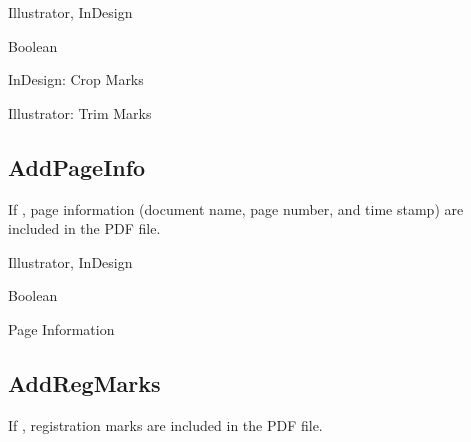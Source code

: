 \documentclass[letterpaper,12pt,english,openany,oneside]{sphinxmanual}
\begin{document}
\label{\detokenize{PDF_Create_NewNamespaces:supported-by-2}}

Illustrator, InDesign

\label{\detokenize{PDF_Create_NewNamespaces:type-2}}

Boolean

\label{\detokenize{PDF_Create_NewNamespaces:ui-name-2}}

InDesign: Crop Marks

Illustrator: Trim Marks

\label{\detokenize{PDF_Create_NewNamespaces:default-value-2}}

\begin{sphinxVerbatim}[commandchars=\\\{\}]
\end{sphinxVerbatim}


\subsection{AddPageInfo}
\label{\detokenize{PDF_Create_NewNamespaces:addpageinfo}}
If  , page information (document name, page number, and time stamp) are included in the PDF file.

\label{\detokenize{PDF_Create_NewNamespaces:supported-by-3}}

Illustrator, InDesign

\label{\detokenize{PDF_Create_NewNamespaces:type-3}}

Boolean

\label{\detokenize{PDF_Create_NewNamespaces:ui-name-3}}

Page Information

\label{\detokenize{PDF_Create_NewNamespaces:default-value-3}}

\begin{sphinxVerbatim}[commandchars=\\\{\}]
\end{sphinxVerbatim}


\subsection{AddRegMarks}
\label{\detokenize{PDF_Create_NewNamespaces:addregmarks}}
If  , registration marks are included in the PDF file.
\end{document}
